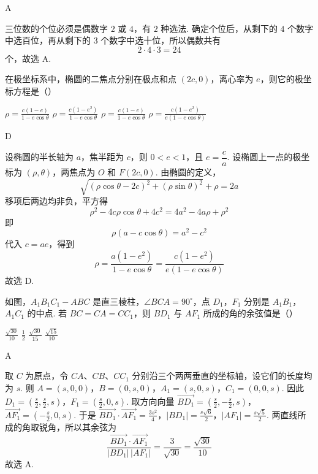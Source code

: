 \documentclass[UTF8,a4paper,oneside,11pt]{ctexbook}
\begin{document}
\begin{answer}
A
\end{answer}

\begin{solution}
三位数的个位必须是偶数字 \(2\) 或 \(4\)，有 \(2\) 种选法. 确定个位后，从剩下的 \(4\) 个数字中选百位，再从剩下的 \(3\) 个数字中选十位，所以偶数共有
\[
2\cdot4\cdot3=24
\]
个，故选 A.
\end{solution}

\begin{problem}
在极坐标系中，椭圆的二焦点分别在极点和点 \((2c,0)\)，离心率为 \(e\)，则它的极坐标方程是（\quad）

\choices
    {\(\rho = \frac{c(1 - e)}{1 - e\cos\theta}\)}
    {\(\rho = \frac{c(1 - e^2)}{1 - e\cos\theta}\)}
    {\(\rho = \frac{c(1 - e)}{1 - e\cos\theta}\)}
    {\(\rho = \frac{c(1 - e^2)}{e (1 - e\cos\theta)}\)}
\end{problem}

\begin{answer}
D
\end{answer}

\begin{solution}
设椭圆的半长轴为 \(a\)，焦半距为 \(c\)，则 \(0<e<1\)，且 \(e=\dfrac ca\). 设椭圆上一点的极坐标为 \((\rho,\theta)\)，两焦点为 \(O\) 和 \(F(2c,0)\). 由椭圆的定义，
\[
\sqrt{(\rho\cos\theta-2c)^2+(\rho\sin\theta)^2}+\rho=2a
\]
移项后两边均非负，平方得
\[
\rho^2-4c\rho\cos\theta+4c^2=4a^2-4a\rho+\rho^2
\]
即
\[
\rho\left(a-c\cos\theta\right)=a^2-c^2
\]
代入 \(c=ae\)，得到
\[
\rho=\frac{a(1-e^2)}{1-e\cos\theta}
=\frac{c(1-e^2)}{e(1-e\cos\theta)}
\]
故选 D.
\end{solution}

\begin{problem}
如图，\(A_{1}B_{1}C_{1}-ABC\) 是直三棱柱，\(\angle BCA=90^{\circ}\)，点 \(D_{1}\)，\(F_{1}\) 分别是 \(A_{1}B_{1}\)，\(A_{1}C_{1}\) 的中点. 若 \(BC=CA=CC_{1}\)，则 \(BD_{1}\) 与 \(AF_{1}\) 所成的角的余弦值是（\quad）


\choices
    {\(\frac{\sqrt{30}}{10}\)}
    {\(\frac{1}{2}\)}
    {\(\frac{\sqrt{30}}{15}\)}
    {\(\frac{\sqrt{15}}{10}\)}
\end{problem}

\begin{answer}
A
\end{answer}

\begin{solution}
取 \(C\) 为原点，令 \(CA\)、\(CB\)、\(CC_1\) 分别沿三个两两垂直的坐标轴，设它们的长度均为 \(s\). 则
\(A=(s,0,0)\)，\(B=(0,s,0)\)，\(A_1=(s,0,s)\)，\(C_1=(0,0,s)\).
因此
\(D_1=\left(\frac s2,\frac s2,s\right)\)，\(F_1=\left(\frac s2,0,s\right)\).
取方向向量
\(\overrightarrow{BD_1}=\left(\frac s2,-\frac s2,s\right)\)，\(\overrightarrow{AF_1}=\left(-\frac s2,0,s\right)\).
于是
\(\overrightarrow{BD_1}\cdot\overrightarrow{AF_1}=\frac{3s^2}{4}\)，\(|BD_1|=\frac{s\sqrt6}{2}\)，\(|AF_1|=\frac{s\sqrt5}{2}\).
两直线所成的角取锐角，所以其余弦为
\[
\frac{\overrightarrow{BD_1}\cdot\overrightarrow{AF_1}}{|BD_1|\,|AF_1|}
=\frac{3}{\sqrt{30}}=\frac{\sqrt{30}}{10}
\]
故选 A.
\end{solution}
\end{document}
